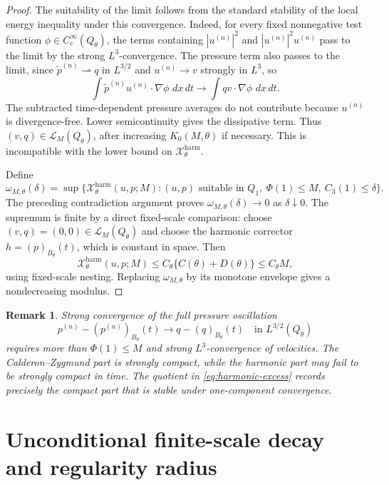 \documentclass[pdflatex,sn-mathphys-num]{sn-jnl}
\numberwithin{equation}{section}
\theoremstyle{thmstyleone}
\theoremstyle{thmstylethree}
\newtheorem{remark}[theorem]{Remark}
\newcommand{\dxdt}{\,dx\,dt}
\newcommand{\calL}{\mathcal L}
\newcommand{\calX}{\mathcal X}
\newcommand{\harm}{\mathrm{harm}}
\begin{document}
\begin{proof}
The suitability of the limit follows from the standard stability of the local energy inequality under this convergence.  Indeed, for every fixed nonnegative test function \(\phi\in C_c^\infty(Q_\theta)\), the terms containing \(|u^{(n)}|^2\) and \(|u^{(n)}|^2u^{(n)}\) pass to the limit by the strong \(L^3\)-convergence.  The pressure term also passes to the limit, since \(\widetilde p^{(n)}\rightharpoonup q\) in \(L^{3/2}\) and \(u^{(n)}\to v\) strongly in \(L^3\), so
\[
        \int \widetilde p^{(n)}u^{(n)}\cdot\nabla\phi\,\dxdt
        \longrightarrow
        \int qv\cdot\nabla\phi\,\dxdt .
\]
The subtracted time-dependent pressure averages do not contribute because \(u^{(n)}\) is divergence-free.  Lower semicontinuity gives the dissipative term.  Thus \((v,q)\in\calL_M(Q_\theta)\), after increasing \(K_0(M,\theta)\) if necessary.  This is incompatible with the lower bound on \(\calX^{\harm}_\theta\).

Define
\[
\omega_{M,\theta}(\delta)
=\sup\{\calX^{\harm}_\theta(u,p;M): (u,p)\text{ suitable in }Q_1,
\ \Phi(1)\le M,
\ C_3(1)\le\delta\}.
\]
The preceding contradiction argument proves \(\omega_{M,\theta}(\delta)\to0\) as \(\delta\downarrow0\).  The supremum is finite by a direct fixed-scale comparison: choose \((v,q)=(0,0)\in\calL_M(Q_\theta)\) and choose the harmonic corrector \(h=(p)_{B_\theta}(t)\), which is constant in space.  Then
\[
        \calX^{\harm}_\theta(u,p;M)
        \le C_\theta\{C(\theta)+D(\theta)\}
        \le C_\theta M,
\]
using fixed-scale nesting.  Replacing \(\omega_{M,\theta}\) by its monotone envelope gives a nondecreasing modulus.
\end{proof}

\begin{remark}
Strong convergence of the full pressure oscillation
\[
        p^{(n)}-(p^{(n)})_{B_\theta}(t)
        \longrightarrow q-(q)_{B_\theta}(t)
        \quad\text{in }L^{3/2}(Q_\theta)
\]
requires more than \(\Phi(1)\le M\) and strong \(L^3\)-convergence of velocities.  The Calderon--Zygmund part is strongly compact, while the harmonic part may fail to be strongly compact in time.  The quotient in \eqref{eq:harmonic-excess} records precisely the compact part that is stable under one-component convergence.
\end{remark}

\section{Unconditional finite-scale decay and regularity radius}
\label{sec:unconditional-decay}
\end{document}
